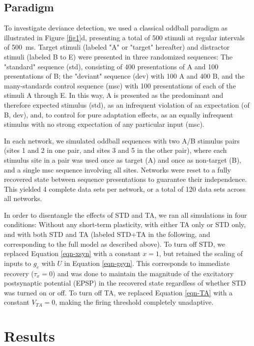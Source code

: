 \documentclass[pdflatex,referee,iicol,sn-basic]{sn-jnl}
\theoremstyle{thmstyleone}%
\theoremstyle{thmstyletwo}%
\theoremstyle{thmstylethree}%
\begin{document}
\subsection{Paradigm}\label{sec-paradigm}

To investigate deviance detection, we used a classical oddball paradigm as illustrated in Figure \ref{fig1}d, presenting a total of 500 stimuli at regular intervals of 500~ms. Target stimuli (labeled "A" or "target" hereafter) and distractor stimuli (labeled B to E) were presented in three randomized sequences: The "standard" sequence (std), consisting of 400 presentations of A and 100 presentations of B; the "deviant" sequence (dev) with 100 A and 400 B, and the many-standards control sequence (msc) with 100 presentations of each of the stimuli A through E. In this way, A is presented as the predominant and therefore expected stimulus (std), as an infrequent violation of an expectation (of B, dev), and, to control for pure adaptation effects, as an equally infrequent stimulus with no strong expectation of any particular input (msc).

In each network, we simulated oddball sequences with two A/B stimulus pairs (sites 1 and 2 in one pair, and sites 3 and 5 in the other pair), where each stimulus site in a pair was used once as target (A) and once as non-target (B), and a single msc sequence involving all sites. Networks were reset to a fully recovered state between sequence presentations to guarantee their independence. This yielded 4 complete data sets per network, or a total of 120 data sets across all networks.

In order to disentangle the effects of STD and TA, we ran all simulations in four conditions: Without any short-term plasticity, with either TA only or STD only, and with both STD and TA (labeled STD+TA in the following, and corresponding to the full model as described above). To turn off STD, we replaced Equation \ref{eqn-xsyn} with a constant $x = 1$, but retained the scaling of inputs to $g_e$ with $U$ in Equation \ref{eqn-gsyn}. This corresponds to immediate recovery ($\tau_x = 0$) and was done to maintain the magnitude of the excitatory postsynaptic potential (EPSP) in the recovered state regardless of whether STD was turned on or off. To turn off TA, we replaced Equation \ref{eqn-TA} with a constant $V_{TA} = 0$, making the firing threshold completely unadaptive.

\section{Results}\label{sec-results}
\end{document}
